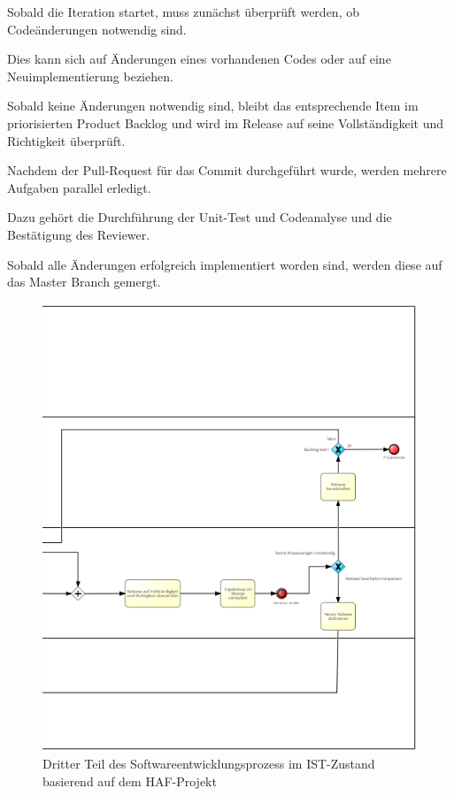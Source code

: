 Sobald die Iteration startet, muss zunächst überprüft werden, ob Codeänderungen notwendig sind. 

Dies kann sich auf Änderungen eines vorhandenen Codes oder auf eine Neuimplementierung beziehen. 

Sobald keine Änderungen notwendig sind, bleibt das entsprechende Item im priorisierten Product Backlog und wird im Release auf seine Vollständigkeit und Richtigkeit überprüft.

Nachdem der Pull-Request für das Commit durchgeführt wurde, werden mehrere Aufgaben parallel erledigt. 

Dazu gehört die Durchführung der Unit-Test und Codeanalyse und die Bestätigung des Reviewer.

Sobald alle Änderungen erfolgreich implementiert worden sind, werden diese auf das Master Branch gemergt. 

\begin{figure}[h]
    \centering
    \includegraphics[scale=0.8]{Bilder/IST-Prozess_third Part.png}
    \caption{Dritter Teil des Softwareentwicklungsprozess im IST-Zustand basierend auf dem HAF-Projekt}
\end{figure}

